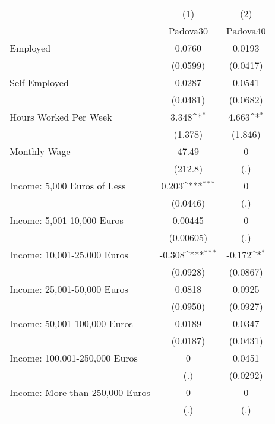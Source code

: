 {
\def\sym#1{\ifmmode^{#1}\else\(^{#1}\)\fi}
\begin{tabular}{l*{2}{c}}
\toprule
            &\multicolumn{1}{c}{(1)}&\multicolumn{1}{c}{(2)}\\
            &\multicolumn{1}{c}{Padova30}&\multicolumn{1}{c}{Padova40}\\
\midrule
Employed    &      0.0760         &      0.0193         \\
            &    (0.0599)         &    (0.0417)         \\
\addlinespace
Self-Employed&      0.0287         &      0.0541         \\
            &    (0.0481)         &    (0.0682)         \\
\addlinespace
Hours Worked Per Week&       3.348\sym{*}  &       4.663\sym{*}  \\
            &     (1.378)         &     (1.846)         \\
\addlinespace
Monthly Wage&       47.49         &           0         \\
            &     (212.8)         &         (.)         \\
\addlinespace
Income: 5,000 Euros of Less&       0.203\sym{***}&           0         \\
            &    (0.0446)         &         (.)         \\
\addlinespace
Income: 5,001-10,000 Euros&     0.00445         &           0         \\
            &   (0.00605)         &         (.)         \\
\addlinespace
Income: 10,001-25,000 Euros&      -0.308\sym{***}&      -0.172\sym{*}  \\
            &    (0.0928)         &    (0.0867)         \\
\addlinespace
Income: 25,001-50,000 Euros&      0.0818         &      0.0925         \\
            &    (0.0950)         &    (0.0927)         \\
\addlinespace
Income: 50,001-100,000 Euros&      0.0189         &      0.0347         \\
            &    (0.0187)         &    (0.0431)         \\
\addlinespace
Income: 100,001-250,000 Euros&           0         &      0.0451         \\
            &         (.)         &    (0.0292)         \\
\addlinespace
Income: More than 250,000 Euros&           0         &           0         \\
            &         (.)         &         (.)         \\
\bottomrule
\end{tabular}
}
